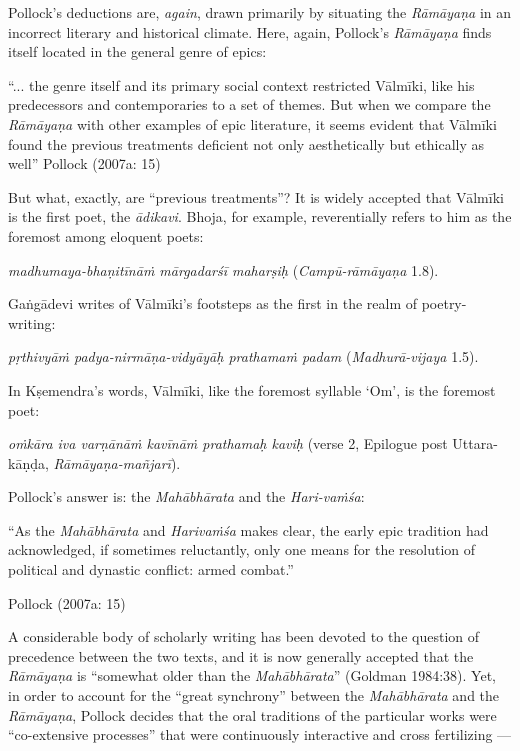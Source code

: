 Pollock’s deductions are, {\sl again}, drawn primarily by situating the {\sl Rāmāyaṇa} in an incorrect literary and historical climate. Here, again, Pollock’s {\sl Rāmāyaṇa} finds itself located in the general genre of epics:

\begin{myquote}
“... the genre itself and its primary social context restricted Vālmīki, like his predecessors and contemporaries to a set of themes. But when we compare the {\sl Rāmāyaṇa} with other examples of epic literature, it seems evident that Vālmīki found the previous treatments deficient not only aesthetically but ethically as well”
\hfill Pollock (2007a: 15)
\end{myquote}

But what, exactly, are “previous treatments”? It is widely accepted that Vālmīki is the first poet, the {\sl ādikavi}. Bhoja, for example, reverentially refers to him as the foremost among eloquent poets:

{\sl madhumaya-bhaṇitīnāṁ mārgadarśī maharṣiḥ} ({\sl Campū-rāmāyaṇa} 1.8). 

Gaṅgādevi writes of Vālmīki’s footsteps as the first in the realm of poetry-writing:   

{\sl pṛthivyāṁ padya-nirmāṇa-vidyāyāḥ prathamaṁ padam} ({\sl Madhurā-vijaya} 1.5). 

In Kṣemendra’s words, Vālmīki, like the foremost syllable ‘Om’, is the foremost poet:

{\sl oṁkāra iva varṇānāṁ kavīnāṁ prathamaḥ kaviḥ} (verse 2, Epilogue post Uttara-kāṇḍa, {\sl Rāmāyaṇa-mañjarī}).

\smallskip

Pollock’s answer is: the {\sl Mahābhārata} and the {\sl Hari-vaṁśa}:

\begin{myquote}
“As the {\sl Mahābhārata} and {\sl Harivaṁśa} makes clear, the early epic tradition had acknowledged, if sometimes reluctantly, only one means for the resolution of political and dynastic conflict: armed combat.”

\hfill Pollock (2007a: 15)
\end{myquote}

A considerable body of scholarly writing has been devoted to the question of precedence between the two texts, and it is now generally accepted that the {\sl Rāmāyaṇa} is “somewhat older than the {\sl Mahābhārata}” (Goldman 1984:38). Yet, in order to account for the “great synchrony” between the {\sl Mahābhārata} and the {\sl Rāmāyaṇa}, Pollock decides that the oral traditions of the particular works were “co-extensive processes” that were continuously interactive and cross fertilizing ---

